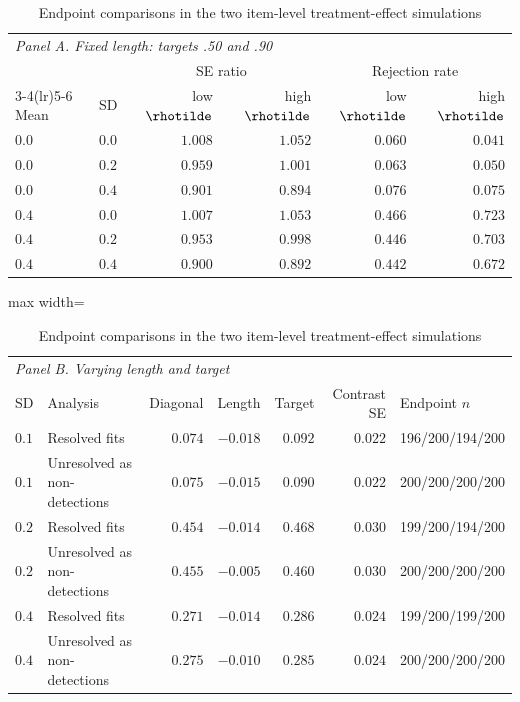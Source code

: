 \begin{table}[htbp]\centering
\caption{Endpoint comparisons in the two item-level treatment-effect simulations}
\label{tab:s6-arms}
{\small\begin{tabular}{llrrrr}
\toprule
\multicolumn{6}{l}{\emph{Panel A. Fixed length: targets .50 and .90}} \\
 & & \multicolumn{2}{c}{SE ratio} & \multicolumn{2}{c}{Rejection rate} \\
\cmidrule(lr){3-4}\cmidrule(lr){5-6}
Mean & SD & low $\rhotilde$ & high $\rhotilde$ & low $\rhotilde$ & high $\rhotilde$ \\
\midrule
$0.0$ & $0.0$ & $1.008$ & $1.052$ & $0.060$ & $0.041$ \\
$0.0$ & $0.2$ & $0.959$ & $1.001$ & $0.063$ & $0.050$ \\
$0.0$ & $0.4$ & $0.901$ & $0.894$ & $0.076$ & $0.075$ \\
$0.4$ & $0.0$ & $1.007$ & $1.053$ & $0.466$ & $0.723$ \\
$0.4$ & $0.2$ & $0.953$ & $0.998$ & $0.446$ & $0.703$ \\
$0.4$ & $0.4$ & $0.900$ & $0.892$ & $0.442$ & $0.672$ \\
\bottomrule
\end{tabular}}
\vspace{0.6em}
{\scriptsize\begin{adjustbox}{max width=\textwidth}\begin{tabular}{llrrrrl}
\toprule
\multicolumn{7}{l}{\emph{Panel B. Varying length and target}} \\
SD & Analysis & Diagonal & Length & Target & Contrast SE & Endpoint $n$ \\
\midrule
$0.1$ & Resolved fits & $0.074$ & $-0.018$ & $0.092$ & $0.022$ & 196/200/194/200 \\
$0.1$ & Unresolved as non-detections & $0.075$ & $-0.015$ & $0.090$ & $0.022$ & 200/200/200/200 \\
$0.2$ & Resolved fits & $0.454$ & $-0.014$ & $0.468$ & $0.030$ & 199/200/194/200 \\
$0.2$ & Unresolved as non-detections & $0.455$ & $-0.005$ & $0.460$ & $0.030$ & 200/200/200/200 \\
$0.4$ & Resolved fits & $0.271$ & $-0.014$ & $0.286$ & $0.024$ & 199/200/199/200 \\
$0.4$ & Unresolved as non-detections & $0.275$ & $-0.010$ & $0.285$ & $0.024$ & 200/200/200/200 \\
\bottomrule
\end{tabular}\end{adjustbox}}

\end{table}
